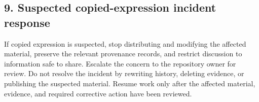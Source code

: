 \documentclass[
  letterpaper,
]{article}
\begin{document}
\subsection{9. Suspected copied-expression incident response}\label{9-suspected-copied-expression-incident-response}

If copied expression is suspected, stop distributing and modifying the affected material, preserve the relevant
provenance records, and restrict discussion to information safe to share. Escalate the concern to the repository owner
for review. Do not resolve the incident by rewriting history, deleting evidence, or publishing the suspected material.
Resume work only after the affected material, evidence, and required corrective action have been reviewed.
\end{document}
